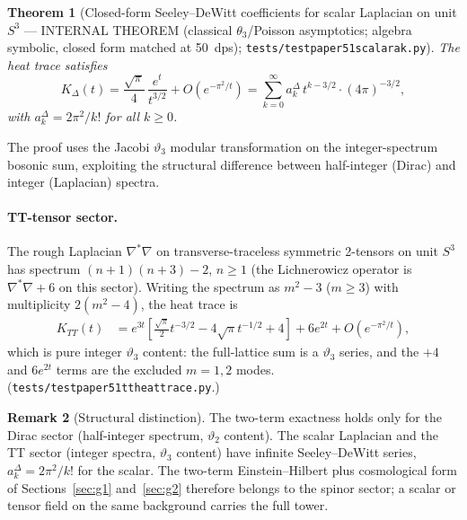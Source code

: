 \documentclass[11pt,a4paper]{article}
\theoremstyle{plain}
\newtheorem{theorem}{Theorem}[section]
\theoremstyle{definition}
\newtheorem{remark}[theorem]{Remark}
\newcommand{\sthree}{S^{3}}
\renewcommand{\_}{\textunderscore\allowbreak}
\begin{document}
\begin{theorem}[Closed-form Seeley--DeWitt coefficients for scalar
                Laplacian on unit $\sthree$ --- INTERNAL THEOREM
                (classical $\theta_3$/Poisson asymptotics; algebra
                symbolic, closed form matched at 50~dps);
                \texttt{tests/test\_paper51\_scalar\_ak.py}]
\label{thm:scalar_ak}
The heat trace satisfies
\begin{equation}
  K_{\Delta}(t) = \frac{\sqrt{\pi}}{4}\, \frac{e^t}{t^{3/2}}
                + O(e^{-\pi^2/t})
              = \sum_{k=0}^\infty a_k^{\Delta}\, t^{k - 3/2} \cdot (4\pi)^{-3/2},
\end{equation}
with $a_k^{\Delta} = 2\pi^2/k!$ for all $k \geq 0$.
\end{theorem}

The proof uses the Jacobi $\vartheta_3$ modular transformation on
the integer-spectrum bosonic sum, exploiting the structural
difference between half-integer (Dirac) and integer (Laplacian)
spectra.

\paragraph{TT-tensor sector.} The rough Laplacian $\nabla^*\nabla$ on
transverse-traceless symmetric 2-tensors on unit $\sthree$ has
spectrum $(n+1)(n+3) - 2$, $n \ge 1$ (the Lichnerowicz operator is
$\nabla^*\nabla + 6$ on this sector). Writing the spectrum as $m^2 - 3$
($m \ge 3$) with multiplicity $2(m^2-4)$, the heat trace is
\begin{align}
  K_{TT}(t) &= e^{3t}\!\left[\frac{\sqrt{\pi}}{2} t^{-3/2}
                              - 4\sqrt{\pi} t^{-1/2} + 4\right]
               + 6 e^{2t} + O(e^{-\pi^2/t}),
\end{align}
which is pure integer $\vartheta_3$ content: the full-lattice sum is a
$\vartheta_3$ series, and the $+4$ and $6e^{2t}$ terms are the excluded
$m = 1, 2$ modes. (\texttt{tests/test\_paper51\_tt\_heat\_trace.py}.)

\begin{remark}[Structural distinction]
The two-term exactness holds only for the Dirac sector (half-integer
spectrum, $\vartheta_2$ content). The scalar Laplacian and the TT sector
(integer spectra, $\vartheta_3$ content) have infinite Seeley--DeWitt
series, $a_k^{\Delta} = 2\pi^2/k!$ for the scalar. The two-term
Einstein--Hilbert plus cosmological form of Sections~\ref{sec:g1}
and~\ref{sec:g2} therefore belongs to the spinor sector; a scalar or tensor
field on the same background carries the full tower.
\end{remark}
\end{document}
